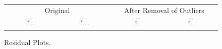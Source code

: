 \documentclass[11pt]{scrartcl} %
\begin{document}
\begin{figure}[H] %
	\centering
	\begin{tabular}{p{} p{}p{}p{}}
	\hline
	\multicolumn{2}{|c|}{Original} &  \multicolumn{2}{|c|}{After Removal of Outliers} \\
		\multicolumn{1}{|c}{\includegraphics[width=0.23\textwidth]{../graphics/A1Residuals1}} &
		\multicolumn{1}{c|}{\includegraphics[width=0.23\textwidth]{../graphics/A1StudentResiduals1}} &
		\multicolumn{1}{|c}{\includegraphics[width=0.23\textwidth]{../graphics/A1Residuals2}} &
		\multicolumn{1}{c|}{\includegraphics[width=0.23\textwidth]{../graphics/A1StudentResiduals2}}\\
		\hline
	\end{tabular}		
	\caption{Residual Plots.}
	\label{fig:A1RP}
\end{figure}
\end{document}
